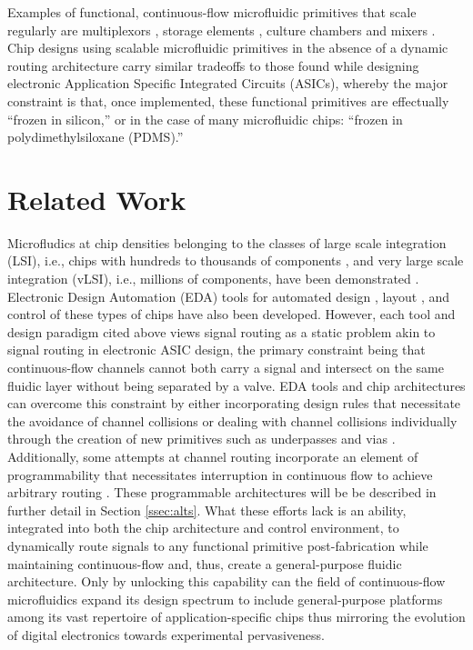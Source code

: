 Examples of functional, continuous-flow microfluidic primitives that scale regularly are multiplexors \cite{thorsen2002}, storage elements \cite{thies2008}, culture chambers \cite{fidalgo2011} and mixers \cite{jensen2013}. Chip designs using scalable microfluidic primitives in the absence of a dynamic routing architecture carry similar tradeoffs to those found while designing electronic Application Specific Integrated Circuits (ASICs), whereby the major constraint is that, once implemented, these functional primitives are effectually ``frozen in silicon,'' or in the case of many microfluidic chips: ``frozen in polydimethylsiloxane (PDMS).'' 

\section{Related Work}
\label{sec:xposer_rw}
Microfludics at chip densities belonging to the classes of large scale integration (LSI), i.e., chips with hundreds to thousands of components \cite{thorsen2002}, and very large scale integration (vLSI), i.e., millions of components, have been demonstrated \cite{araci2014}. Electronic Design Automation (EDA) tools for automated design \cite{mcdaniel2013}, layout \cite{huang2014}, and control \cite{thies2008} of these types of chips have also been developed. However, each tool and design paradigm cited above views signal routing as a static problem akin to signal routing in electronic ASIC design, the primary constraint being that continuous-flow channels cannot both carry a signal and intersect on the same fluidic layer without being separated by a valve. EDA tools and chip architectures can overcome this constraint by either incorporating design rules that necessitate the avoidance of channel collisions \cite{huang2014} or dealing with channel collisions individually through the creation of new primitives such as underpasses and vias \cite{huft2013microfluidic}. Additionally, some attempts at channel routing incorporate an element of programmability that necessitates interruption in continuous flow to achieve arbitrary routing \cite{thorsen2002}. These programmable architectures will be be described in further detail in Section \ref{ssec:alts}. What these efforts lack is an ability, integrated into both the chip architecture and control environment, to dynamically route signals to any functional primitive post-fabrication while maintaining continuous-flow and, thus, create a general-purpose fluidic architecture. Only by unlocking this capability can the field of continuous-flow microfluidics expand its design spectrum to include general-purpose platforms among its vast repertoire of application-specific chips thus mirroring the evolution of digital electronics towards experimental pervasiveness. 

